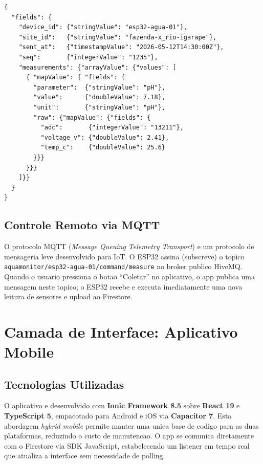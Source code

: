 \documentclass[12pt, a4paper]{article}
\begin{document}
\begin{lstlisting}[language={},caption={Trecho do payload JSON enviado ao Firestore -- estrutura de uma medicao de pH.}]
{
  "fields": {
    "device_id": {"stringValue": "esp32-agua-01"},
    "site_id":   {"stringValue": "fazenda-x_rio-igarape"},
    "sent_at":   {"timestampValue": "2026-05-12T14:30:00Z"},
    "seq":       {"integerValue": "1235"},
    "measurements": {"arrayValue": {"values": [
      { "mapValue": { "fields": {
        "parameter":  {"stringValue": "pH"},
        "value":      {"doubleValue": 7.18},
        "unit":       {"stringValue": "pH"},
        "raw": {"mapValue": {"fields": {
          "adc":       {"integerValue": "13211"},
          "voltage_v": {"doubleValue": 2.41},
          "temp_c":    {"doubleValue": 25.6}
        }}}
      }}}
    ]}}
  }
}
\end{lstlisting}

\subsection{Controle Remoto via MQTT}

O protocolo MQTT (\textit{Message Queuing Telemetry Transport}) e um protocolo de mensageria
leve desenvolvido para IoT. O ESP32 assina (subscreve) o topico
\texttt{aquamonitor/esp32-agua-01/command/measure} no broker publico HiveMQ. Quando o
usuario pressiona o botao ``Coletar'' no aplicativo, o app publica uma mensagem neste topico;
o ESP32 recebe e executa imediatamente uma nova leitura de sensores e upload ao Firestore.

\section{Camada de Interface: Aplicativo Mobile}

\subsection{Tecnologias Utilizadas}

O aplicativo e desenvolvido com \textbf{Ionic Framework 8.5} sobre \textbf{React 19} e
\textbf{TypeScript 5}, empacotado para Android e iOS via \textbf{Capacitor 7}. Esta
abordagem \textit{hybrid mobile} permite manter uma unica base de codigo para as duas
plataformas, reduzindo o custo de manutencao. O app se comunica diretamente com o Firestore
via SDK JavaScript, estabelecendo um listener em tempo real que atualiza a interface sem
necessidade de polling.
\end{document}
